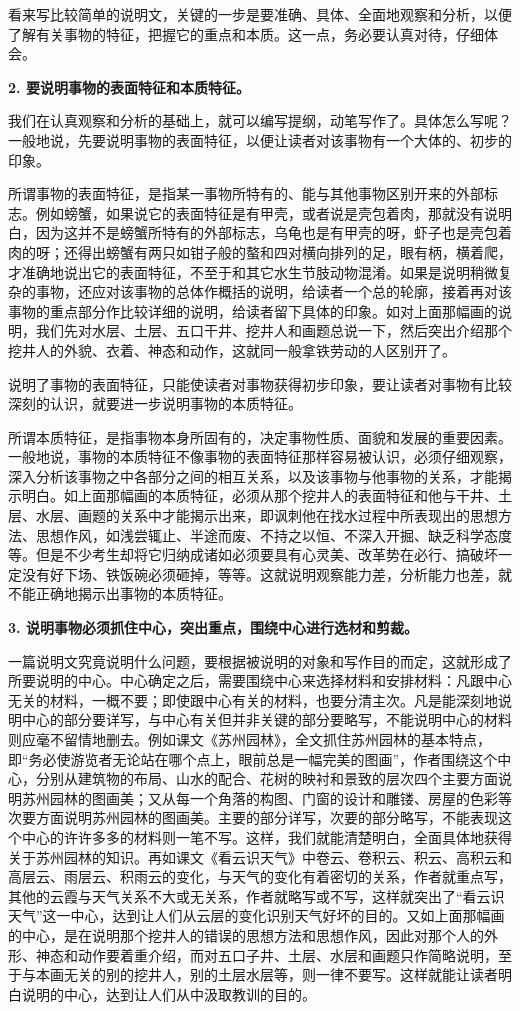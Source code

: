 看来写比较简单的说明文，关键的一步是要准确、具体、全面地观察和分析，以便了解有关事物的特征，把握它的重点和本质。这一点，务必要认真对待，仔细体会。

\textbf{2. 要说明事物的表面特征和本质特征。}

我们在认真观察和分析的基础上，就可以编写提纲，动笔写作了。具体怎么写呢？一般地说，先要说明事物的表面特征，以便让读者对该事物有一个大体的、初步的印象。

所谓事物的表面特征，是指某一事物所特有的、能与其他事物区别开来的外部标志。例如螃蟹，如果说它的表面特征是有甲壳，或者说是壳包着肉，那就没有说明白，因为这并不是螃蟹所特有的外部标志，乌龟也是有甲壳的呀，虾子也是壳包着肉的呀；还得出螃蟹有两只如钳子般的螯和四对横向排列的足，眼有柄，横着爬，才准确地说出它的表面特征，不至于和其它水生节肢动物混淆。如果是说明稍微复杂的事物，还应对该事物的总体作概括的说明，给读者一个总的轮廓，接着再对该事物的重点部分作比较详细的说明，给读者留下具体的印象。如对上面那幅画的说明，我们先对水层、土层、五口干井、挖井人和画题总说一下，然后突出介绍那个挖井人的外貌、衣着、神态和动作，这就同一般拿铁劳动的人区别开了。

说明了事物的表面特征，只能使读者对事物获得初步印象，要让读者对事物有比较深刻的认识，就要进一步说明事物的本质特征。

所谓本质特征，是指事物本身所固有的，决定事物性质、面貌和发展的重要因素。一般地说，事物的本质特征不像事物的表面特征那样容易被认识，必须仔细观察，深入分析该事物之中各部分之间的相互关系，以及该事物与他事物的关系，才能揭示明白。如上面那幅画的本质特征，必须从那个挖井人的表面特征和他与干井、土层、水层、画题的关系中才能揭示出来，即讽刺他在找水过程中所表现出的思想方法、思想作风，如浅尝辄止、半途而废、不持之以恒、不深入开掘、缺乏科学态度等。但是不少考生却将它归纳成诸如必须要具有心灵美、改革势在必行、搞破坏一定没有好下场、铁饭碗必须砸掉，等等。这就说明观察能力差，分析能力也差，就不能正确地揭示出事物的本质特征。

\textbf{3. 说明事物必须抓住中心，突出重点，围绕中心进行选材和剪裁。}

一篇说明文究竟说明什么问题，要根据被说明的对象和写作目的而定，这就形成了所要说明的中心。中心确定之后，需要围绕中心来选择材料和安排材料：凡跟中心无关的材料，一概不要；即使跟中心有关的材料，也要分清主次。凡是能深刻地说明中心的部分要详写，与中心有关但并非关键的部分要略写，不能说明中心的材料则应毫不留情地删去。例如课文《苏州园林》，全文抓住苏州园林的基本特点，即“务必使游览者无论站在哪个点上，眼前总是一幅完美的图画”，作者围绕这个中心，分别从建筑物的布局、山水的配合、花树的映衬和景致的层次四个主要方面说明苏州园林的图画美；又从每一个角落的构图、门窗的设计和雕镂、房屋的色彩等次要方面说明苏州园林的图画美。主要的部分详写，次要的部分略写，不能表现这个中心的许许多多的材料则一笔不写。这样，我们就能清楚明白，全面具体地获得关于苏州园林的知识。再如课文《看云识天气》中卷云、卷积云、积云、高积云和高层云、雨层云、积雨云的变化，与天气的变化有着密切的关系，作者就重点写，其他的云霞与天气关系不大或无关系，作者就略写或不写，这样就突出了“看云识天气”这一中心，达到让人们从云层的变化识别天气好坏的目的。又如上面那幅画的中心，是在说明那个挖井人的错误的思想方法和思想作风，因此对那个人的外形、神态和动作要着重介绍，而对五口子井、土层、水层和画题只作简略说明，至于与本画无关的别的挖井人，别的土层水层等，则一律不要写。这样就能让读者明白说明的中心，达到让人们从中汲取教训的目的。

